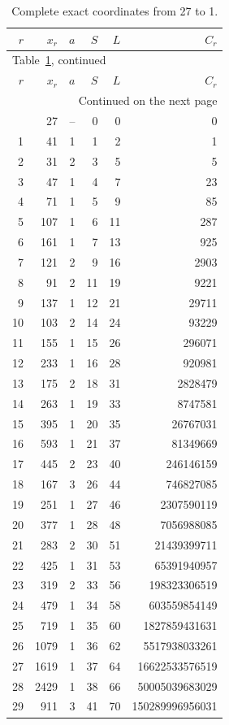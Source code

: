 \begingroup
\small
\setlength{\tabcolsep}{5pt}
\begin{longtable}{rrrrrr}
\caption{Complete exact coordinates from 27 to 1.}\label{tab:27complete}\\
\toprule
$r$&$x_r$&$a$&$S$&$L$&$C_r$\\\midrule
\endfirsthead
\multicolumn{6}{l}{\small Table~\ref{tab:27complete}, continued}\\
\toprule
$r$&$x_r$&$a$&$S$&$L$&$C_r$\\\midrule
\endhead
\midrule\multicolumn{6}{r}{\small Continued on the next page}\\
\endfoot
\bottomrule
\endlastfoot
0&27&--&0&0&0\\
1&41&1&1&2&1\\
2&31&2&3&5&5\\
3&47&1&4&7&23\\
4&71&1&5&9&85\\
5&107&1&6&11&287\\
6&161&1&7&13&925\\
7&121&2&9&16&2903\\
8&91&2&11&19&9221\\
9&137&1&12&21&29711\\
10&103&2&14&24&93229\\
11&155&1&15&26&296071\\
12&233&1&16&28&920981\\
13&175&2&18&31&2828479\\
14&263&1&19&33&8747581\\
15&395&1&20&35&26767031\\
16&593&1&21&37&81349669\\
17&445&2&23&40&246146159\\
18&167&3&26&44&746827085\\
19&251&1&27&46&2307590119\\
20&377&1&28&48&7056988085\\
21&283&2&30&51&21439399711\\
22&425&1&31&53&65391940957\\
23&319&2&33&56&198323306519\\
24&479&1&34&58&603559854149\\
25&719&1&35&60&1827859431631\\
26&1079&1&36&62&5517938033261\\
27&1619&1&37&64&16622533576519\\
28&2429&1&38&66&50005039683029\\
29&911&3&41&70&150289996956031\\

\end{longtable}
